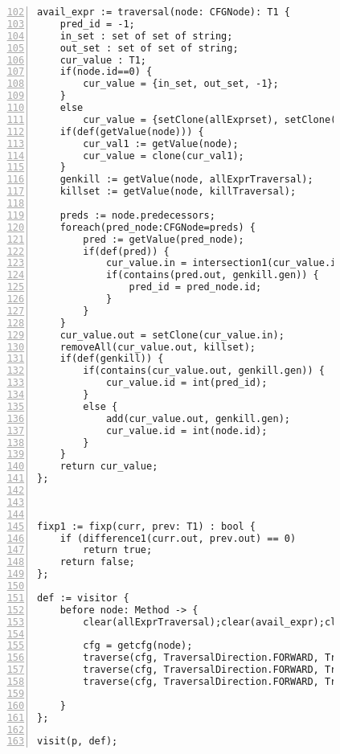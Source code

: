 \begin{figure}[ht!]
\begin{lstlisting}[numbers=left, tabsize=4, escapechar=@, caption={Common subexpression detection},label={lst:csd-code},firstline=102, firstnumber=102]
avail_expr := traversal(node: CFGNode): T1 {
	pred_id = -1;
	in_set : set of set of string;
	out_set : set of set of string;
	cur_value : T1;
	if(node.id==0) {
		cur_value = {in_set, out_set, -1};
	}
	else
		cur_value = {setClone(allExprset), setClone(allExprset), -1};
	if(def(getValue(node))) {
		cur_val1 := getValue(node);
		cur_value = clone(cur_val1);
	}
	genkill := getValue(node, allExprTraversal);
	killset := getValue(node, killTraversal);

	preds := node.predecessors;
	foreach(pred_node:CFGNode=preds) {	
		pred := getValue(pred_node);
		if(def(pred)) {
			cur_value.in = intersection1(cur_value.in, pred.out);
			if(contains(pred.out, genkill.gen)) {
				pred_id = pred_node.id;
			}
		}
	}
	cur_value.out = setClone(cur_value.in);
	removeAll(cur_value.out, killset);
	if(def(genkill)) {
		if(contains(cur_value.out, genkill.gen)) {
			cur_value.id = int(pred_id);
		}
		else {
			add(cur_value.out, genkill.gen);
			cur_value.id = int(node.id);
		}
	}
	return cur_value;
};



fixp1 := fixp(curr, prev: T1) : bool {
	if (difference1(curr.out, prev.out) == 0)
		return true;	
	return false;
};

def := visitor {
	before node: Method -> {
		clear(allExprTraversal);clear(avail_expr);clear(killTraversal);clear(allExprset);

		cfg = getcfg(node);
		traverse(cfg, TraversalDirection.FORWARD, TraversalKind.HYBRID, allExprTraversal);
		traverse(cfg, TraversalDirection.FORWARD, TraversalKind.HYBRID, killTraversal);
		traverse(cfg, TraversalDirection.FORWARD, TraversalKind.HYBRID, avail_expr, fixp1);
			
	}
};

visit(p, def);
\end{lstlisting}
\end{figure}